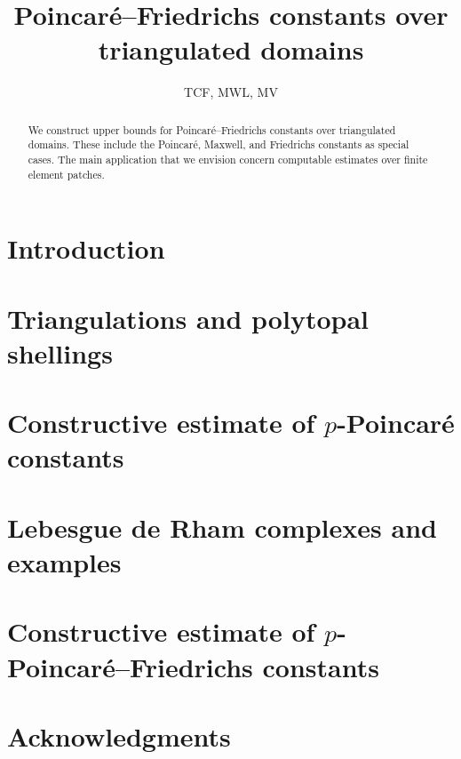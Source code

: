 \documentclass[a4paper]{article}
\title{Poincar\'e--Friedrichs constants over triangulated domains}
\author{TCF, MWL, MV}
\begin{document}
\maketitle

\begin{abstract}
    We construct upper bounds for Poincar\'e--Friedrichs constants over triangulated domains. 
    These include the Poincar\'e, Maxwell, and Friedrichs constants as special cases. 
    The main application that we envision concern computable estimates over finite element patches. 
\end{abstract}

\section{Introduction}
\cite{ern2021finite}


\section{Triangulations and polytopal shellings}
\section{Constructive estimate of $p$-Poincar\'e constants}
\section{Lebesgue de Rham complexes and examples}
\section{Constructive estimate of $p$-Poincar\'e--Friedrichs constants}

\section*{Acknowledgments}



\end{document}
